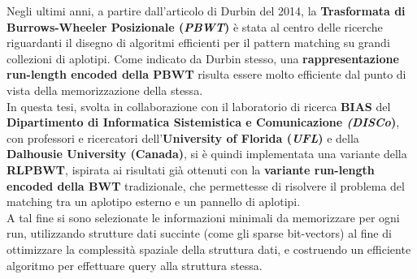 Negli ultimi anni, a partire dall'articolo di Durbin del 2014, la
\textbf{Trasformata di Burrows-Wheeler Posizionale (\textit{PBWT})} è stata al
centro delle ricerche riguardanti 
il disegno di algoritmi efficienti per il pattern matching su grandi collezioni
di aplotipi. Come indicato da Durbin stesso, una \textbf{rappresentazione
  run-length encoded della PBWT} risulta essere molto efficiente dal punto di
vista della memorizzazione della stessa.\\
In questa tesi, svolta in collaborazione con il
laboratorio di ricerca \textbf{BIAS} del \textbf{Dipartimento di Informatica
  Sistemistica e Comunicazione \textit{(DISCo})}, con professori e ricercatori
dell'\textbf{University of Florida (\textit{UFL})} e della \textbf{Dalhousie
  University (Canada)}, si è quindi implementata una variante della
\textbf{RLPBWT}, ispirata ai risultati già ottenuti con la \textbf{variante
  run-length encoded della BWT} tradizionale, che permettesse di risolvere il
problema del matching tra un aplotipo esterno e un pannello di aplotipi.\\
A tal fine si sono selezionate le
informazioni minimali da memorizzare per ogni run, utilizzando strutture dati
succinte (come gli sparse bit-vectors) al fine di ottimizzare la complessità
spaziale della struttura dati, e costruendo un efficiente algoritmo per
effettuare query alla struttura stessa. ​ 